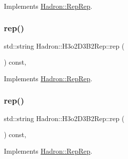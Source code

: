 Implements \mbox{\hyperlink{structHadron_1_1RepRep_ab3213025f6de249f7095892109575fde}{Hadron\+::\+Rep\+Rep}}.

\mbox{\label{structHadron_1_1H3o2D3B2Rep_a7b7bbc5fa5a2e13412b53abb425dc0fd}} 
\subsubsection{\texorpdfstring{rep()}{rep()}\hspace{0.1cm}{\footnotesize\ttfamily [2/5]}}
{\footnotesize\ttfamily std\+::string Hadron\+::\+H3o2\+D3\+B2\+Rep\+::rep (\begin{DoxyParamCaption}{ }\end{DoxyParamCaption}) const\hspace{0.3cm}{\ttfamily [inline]}, {\ttfamily [virtual]}}



Implements \mbox{\hyperlink{structHadron_1_1RepRep_ab3213025f6de249f7095892109575fde}{Hadron\+::\+Rep\+Rep}}.

\mbox{\label{structHadron_1_1H3o2D3B2Rep_a7b7bbc5fa5a2e13412b53abb425dc0fd}} 
\subsubsection{\texorpdfstring{rep()}{rep()}\hspace{0.1cm}{\footnotesize\ttfamily [3/5]}}
{\footnotesize\ttfamily std\+::string Hadron\+::\+H3o2\+D3\+B2\+Rep\+::rep (\begin{DoxyParamCaption}{ }\end{DoxyParamCaption}) const\hspace{0.3cm}{\ttfamily [inline]}, {\ttfamily [virtual]}}



Implements \mbox{\hyperlink{structHadron_1_1RepRep_ab3213025f6de249f7095892109575fde}{Hadron\+::\+Rep\+Rep}}.

\mbox{\label{structHadron_1_1H3o2D3B2Rep_a7b7bbc5fa5a2e13412b53abb425dc0fd}} 
